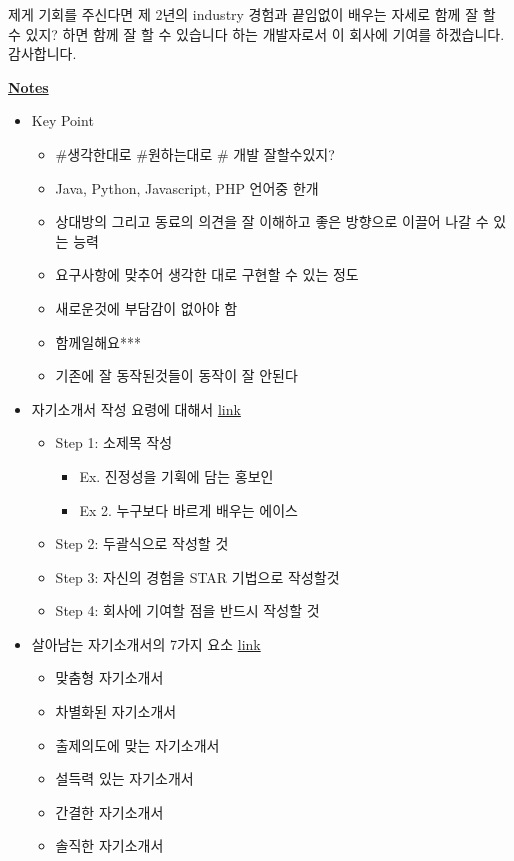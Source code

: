 \documentclass[12pt]{article}
\begin{document}
\bigskip

제게 기회를 주신다면 제 2년의 industry 경험과 끝임없이 배우는 자세로 함께 잘 할 수 있지? 하면 함께 잘 할 수 있습니다
하는 개발자로서 이 회사에 기여를 하겠습니다. 감사합니다.

\underline{\textbf{Notes}}

\begin{itemize}
    \item Key Point
    \begin{itemize}
        \item \#생각한대로 \#원하는대로 \# 개발 잘할수있지?
        \item Java, Python, Javascript, PHP 언어중 한개
        \item 상대방의 그리고 동료의 의견을 잘 이해하고 좋은 방향으로 이끌어 나갈 수 있는 능력
        \item 요구사항에 맞추어 생각한 대로 구현할 수 있는 정도
        \item 새로운것에 부담감이 없아야 함
        \item 함께일해요***

        \item 기존에 잘 동작된것들이 동작이 잘 안된다

    \end{itemize}
    \item 자기소개서 작성 요령에 대해서 \href{https://brunch.co.kr/@hklim/11}{link}
    \begin{itemize}
        \item Step 1: 소제목 작성
        \begin{itemize}
            \item Ex. 진정성을 기휙에 담는 홍보인
            \item Ex 2. 누구보다 바르게 배우는 에이스
        \end{itemize}
        \item Step 2: 두괄식으로 작성할 것
        \item Step 3: 자신의 경험을 STAR 기법으로 작성할것
        \item Step 4: 회사에 기여할 점을 반드시 작성할 것
    \end{itemize}

    \bigskip
    \item 살아남는 자기소개서의 7가지 요소 \href{https://brunch.co.kr/@kuehyunpark/6}{link}
    \begin{itemize}
        \item 맞춤형 자기소개서
        \item 차별화된 자기소개서
        \item 출제의도에 맞는 자기소개서
        \item 설득력 있는 자기소개서
        \item 간결한 자기소개서
        \item 솔직한 자기소개서
    \end{itemize}

\end{itemize}
\end{document}
